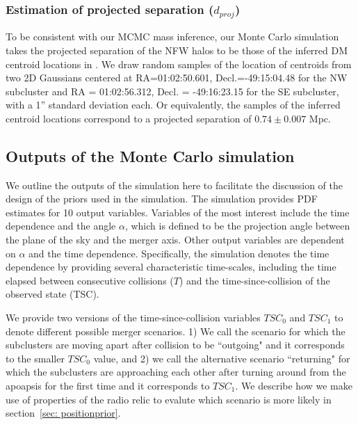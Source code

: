 \subsubsection{Estimation of projected separation ($d_{proj}$)} 
To be consistent with our MCMC mass inference, our Monte Carlo simulation takes 
the projected separation of the NFW halos to be those of the inferred
DM centroid locations in \citealt{Jee13}. We draw random samples
 of the location of centroids from two 2D Gaussians centered at
 RA=01:02:50.601, Decl.=-49:15:04.48 for the NW subcluster and RA =
 01:02:56.312, Decl. = -49:16:23.15 for the SE
subcluster, with a 1'' standard deviation each. Or equivalently, the
samples of the inferred centroid locations correspond to a projected separation of
$0.74\pm {0.007}$ Mpc. 

\subsection{Outputs of the Monte Carlo simulation}\label{sec: outputs}
%

We outline the outputs of the simulation here to facilitate the discussion
of the design of the priors used in the simulation. The simulation
provides PDF estimates for 10 output variables. Variables
of the most interest include the time dependence and the angle $\alpha$, which is
defined to be the projection angle between the plane of the sky and the merger axis. Other output variables are dependent on $\alpha$ and the time
dependence. Specifically, the simulation denotes the time dependence by
providing several characteristic time-scales, including the time
elapsed between consecutive collisions
($T$) and the time-since-collision of the observed state (TSC).  

We provide two versions of the time-since-collision variables $TSC_0$ and
$TSC_1$ to denote different possible merger scenarios. 1) We call the scenario for which the subclusters are
moving apart after collision to be ``outgoing" and it corresponds to the
smaller $TSC_0$ value, and 2) we call the alternative scenario 
``returning" for which the subclusters are approaching each other after turning
around from the apoapsis for the first time and it corresponds to $TSC_1$.
We describe how we make use of properties of the radio relic to evalute
which scenario is more likely in
section~\ref{sec: positionprior}. 
 
